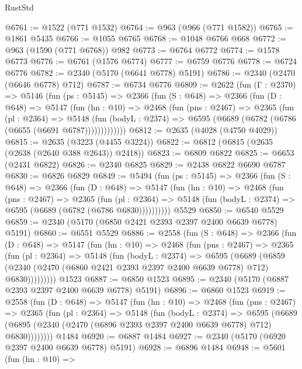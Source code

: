 \begin{lexlean}{RustStd}
\begin{coremodule}
@6761 := @1522 (@771 @1532)
@6764 := @963 (@966 (@771 @1582))
@6765 := @1861 @5435
@6766 := @1055 @6765
@6768 := @1048 @6766 @668
@6772 := @963 (@1590 (@771 @6768)) @982
@6773 := @6764 @6772
@6774 := @1578 @6773
@6776 := @6761 (@1576 @6774)
@6777 := @6759 @6776
@6778 := @6724 @6776
@6782 := @2340 (@5170 (@6641 @6778) @5191)
@6786 := @2340 (@2470 (@6646 @6778) @712)
@6787 := @6734 @6776
@6809 := @2622
    (fun (Γ : @2370) =>
    @5146
      (fun (ps : @5145) =>
      @2366
        (fun (S : @648) =>
        @2366
          (fun (D : @648) =>
          @5147
            (fun (hn : @10) =>
            @2468
              (fun (pns : @2467) =>
              @2365
                (fun (pl : @2364) =>
                @5148
                  (fun (bodyL : @2374) =>
                  @6595 (@6689 (@6782 (@6786 (@6655 (@6691 @6787)))))))))))))
@6812 := @2635 (@4028 (@4750 @4029))
@6815 := @2635 (@3223 (@4455 @3224))
@6822 := @6812 (@6815 (@2635 (@2638 (@2640 @388 @2643)) @2418))
@6823 := @6809 @6822
@6825 := @6653 (@2431 @6822)
@6826 := @2340 @6825
@6829 := @2438 @6822 @6690 @6787
@6830 := @6826 @6829
@6849 := @5494
    (fun (ps : @5145) =>
    @2366
      (fun (S : @648) =>
      @2366
        (fun (D : @648) =>
        @5147
          (fun (hn : @10) =>
          @2468
            (fun (pns : @2467) =>
            @2365
              (fun (pl : @2364) =>
              @5148 (fun (bodyL : @2374) => @6595 (@6689 (@6782 (@6786 @6830))))))))))
    @5529
@6850 := @6540 @5529
@6859 := @2340 (@5170 (@6850 @2421 @2393 @2397 @2400 @6639 @6778) @5191)
@6860 := @6551 @5529
@6886 := @2558
    (fun (S : @648) =>
    @2366
      (fun (D : @648) =>
      @5147
        (fun (hn : @10) =>
        @2468
          (fun (pns : @2467) =>
          @2365
            (fun (pl : @2364) =>
            @5148
              (fun (bodyL : @2374) =>
              @6595
                (@6689
                  (@6859
                    (@2340 (@2470 (@6860 @2421 @2393 @2397 @2400 @6639 @6778) @712) @6830)))))))))
    @1523
@6887 := @6850 @1523
@6895 := @2340 (@5170 (@6887 @2393 @2397 @2400 @6639 @6778) @5191)
@6896 := @6860 @1523
@6919 := @2558
    (fun (D : @648) =>
    @5147
      (fun (hn : @10) =>
      @2468
        (fun (pns : @2467) =>
        @2365
          (fun (pl : @2364) =>
          @5148
            (fun (bodyL : @2374) =>
            @6595
              (@6689 (@6895 (@2340 (@2470 (@6896 @2393 @2397 @2400 @6639 @6778) @712) @6830))))))))
    @1484
@6920 := @6887 @1484
@6927 := @2340 (@5170 (@6920 @2397 @2400 @6639 @6778) @5191)
@6928 := @6896 @1484
@6948 := @5601
    (fun (hn : @10) =>

\end{coremodule}
\end{lexlean}
